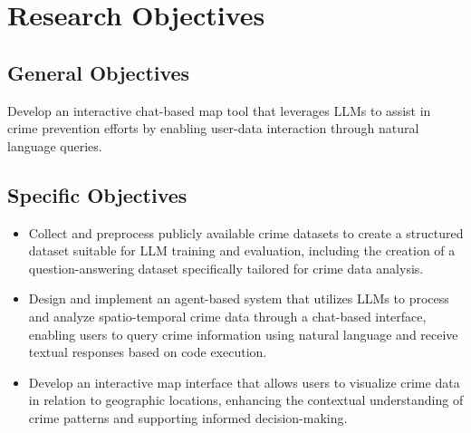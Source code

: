 \section{Research Objectives} %

\subsection{General Objectives}
Develop an interactive chat-based map tool that leverages LLMs to assist in crime prevention efforts by enabling user-data interaction through natural language queries.

\subsection{Specific Objectives}
\begin{itemize}
    \item Collect and preprocess publicly available crime datasets to create a structured dataset suitable for LLM training and evaluation, including the creation of a question-answering dataset specifically tailored for crime data analysis.
    \item Design and implement an agent-based system that utilizes LLMs to process and analyze spatio-temporal crime data through a chat-based interface, enabling users to query crime information using natural language and receive textual responses based on code execution.
    \item Develop an interactive map interface that allows users to visualize crime data in relation to geographic locations, enhancing the contextual understanding of crime patterns and supporting informed decision-making.
\end{itemize}


